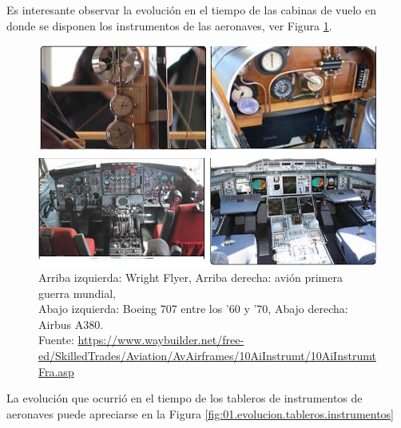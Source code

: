Es interesante observar la 
evoluci\'on en el tiempo de las cabinas de vuelo en donde se disponen los instrumentos de las aeronaves, ver Figura \ref {fig:01.evolucion.cabina}.


\begin{figure}[!htb]
  \centering
  \includegraphics[height=0.6\linewidth, width=0.9\linewidth]{01.tablero.instrumentos/U01.imagenes/1.1.introduccion/evolucion_cabina.jpg} 

  \caption{{ Arriba izquierda: Wright Flyer, Arriba derecha: avi\'on primera guerra mundial, \\
      Abajo izquierda: Boeing 707 entre los '60 y '70, Abajo derecha: Airbus A380.}\\
    {\tiny Fuente:
      \url{https://www.waybuilder.net/free-ed/SkilledTrades/Aviation/AvAirframes/10AiInstrumt/10AiInstrumtFra.asp}}
  }
  \label{fig:01.evolucion.cabina}
\end{figure}

La evoluci\'on que ocurri\'o en el tiempo de los tableros de instrumentos de aeronaves puede apreciarse en la Figura \ref{fig:01.evolucion.tableros.instrumentos}

